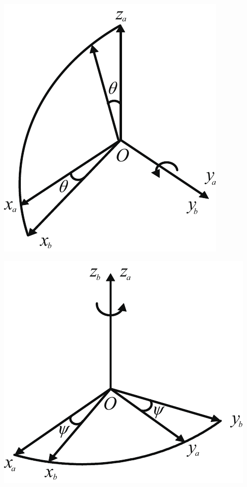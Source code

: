 {{		\begin{minipage}{0.3\linewidth}
			\centering
			\includegraphics[width=0.78\linewidth]{pic/y}
			\vspace*{-0.5em}
			\label{y}
		\end{minipage}
		\begin{minipage}{0.34\linewidth}
			\centering
			\includegraphics[width=0.85\linewidth]{pic/z}
			\vspace*{-0.5em}
			\label{z}
		\end{minipage}
	}
}

